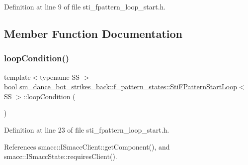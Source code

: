 Definition at line 9 of file sti\+\_\+fpattern\+\_\+loop\+\_\+start.\+h.



\subsection{Member Function Documentation}
\mbox{\label{structsm__dance__bot__strikes__back_1_1f__pattern__states_1_1StiFPatternStartLoop_a6afa94fcfe689fa8ab1e1f521d04a8b4}} 
\subsubsection{\texorpdfstring{loop\+Condition()}{loopCondition()}}
{\footnotesize\ttfamily template$<$typename SS $>$ \\
\hyperlink{classbool}{bool} \hyperlink{structsm__dance__bot__strikes__back_1_1f__pattern__states_1_1StiFPatternStartLoop}{sm\+\_\+dance\+\_\+bot\+\_\+strikes\+\_\+back\+::f\+\_\+pattern\+\_\+states\+::\+Sti\+F\+Pattern\+Start\+Loop}$<$ SS $>$\+::loop\+Condition (\begin{DoxyParamCaption}{ }\end{DoxyParamCaption})\hspace{0.3cm}{\ttfamily [inline]}}



Definition at line 23 of file sti\+\_\+fpattern\+\_\+loop\+\_\+start.\+h.



References smacc\+::\+I\+Smacc\+Client\+::get\+Component(), and smacc\+::\+I\+Smacc\+State\+::requires\+Client().


